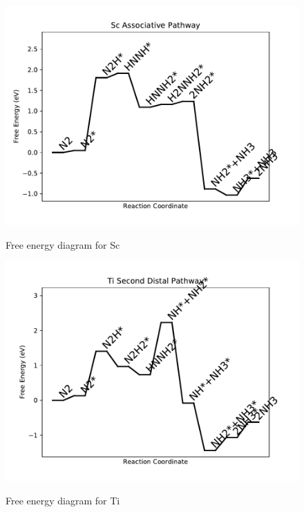 \documentclass{article}
\begin{document}
\begin{figure}
\includegraphics[width=1\linewidth]{data/plots/Sc_associative.pdf}
\label{fig:Sc_associative}
\caption{Free energy diagram for Sc}
\end{figure}

\begin{figure}
\includegraphics[width=1\linewidth]{data/plots/Ti_distal_2.pdf}
\label{fig:Ti_distal_2}
\caption{Free energy diagram for Ti}
\end{figure}
\end{document}
